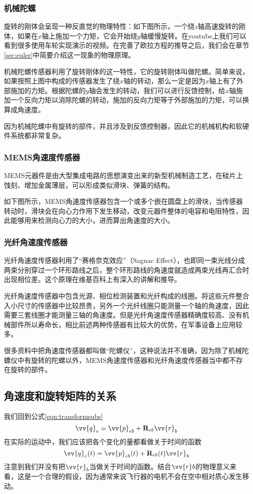 \documentclass[11pt]{article}
\begin{document}
\subsubsection{机械陀螺}
旋转的刚体会呈现一种反直觉的物理特性：如下图所示，一个绕$z$轴高速旋转的刚体，如果在$x$轴上施加一个力矩，它会开始绕$y$轴缓慢旋转。在youtube上我们可以看到很多使用车轮实现演示的视频。在完善了欧拉方程的推导之后，我们会在章节\ref{sec:euler}中简要介绍这一现象的物理原理。

机械陀螺传感器利用了旋转刚体的这一特性，它的旋转刚体叫做陀螺。简单来说，如果按照上图中构成的传感器发生了绕$x$轴的转动，那么一定是因为$x$轴上有了外部施加的力矩。根据陀螺的$y$轴会发生的转动，我们可以进行反馈控制，给$x$轴施加一个反向力矩以消除陀螺的转动，施加的反向力矩等于外部施加的力矩，可以换算成角速度。

因为机械陀螺中有旋转的部件，并且涉及到反馈控制器，因此它的机械机构和软硬件系统都非常复杂。
\subsubsection{MEMS角速度传感器}
MEMS元器件是由大型集成电路的思想演变出来的新型机械制造工艺，在硅片上蚀刻、增加金属薄层，可以形成类似滑块、弹簧的结构。

如下图所示，MEMS角速度传感器包含一个或多个嵌在圆盘上的滑块，当传感器转动时，滑块会在向心力作用下发生移动，改变元器件整体的电容和电阻特性，因此能够用来检测向心力的大小，进而算出角速度的大小。
\subsubsection{光纤角速度传感器}
光纤角速度传感器利用了“赛格奈克效应”（Sagnac Effect），也即同一束光线分成两束分别穿过一个环形路线之后，整个环形路线的角速度就造成两束光线再汇合时出现相位差。这个原理在维基百科上有深入的讲解和推导。

光纤角速度传感器中包含光源、相位检测装置和光纤构成的线圈。将这些元件整合入小尺寸的传感器中比较昂贵，另外一个光纤线圈只能测量一个轴的角速度，因此需要三套线圈才能测量三轴的角速度。但是光纤角速度传感器精确度较高、没有机械部件所以寿命长，相比前述两种传感器有比较大的优势，在军事设备上应用较多。



很多资料中把角速度传感器都叫做“陀螺仪”，这种说法并不准确，因为除了机械陀螺仪中有旋转的陀螺以外，MEMS角速度传感器和光纤角速度传感器当中都不存在旋转的部件。

\subsection{角速度和旋转矩阵的关系}
我们回到公式\ref{eqn:transformsubs}
$$
\vv{q}_{e} = \vv{p}_{eb} + {\bf R}_{eb}\vv{r}_b
$$
在实际的运动中，我们应该把各个变化的量都看做关于时间的函数
\begin{equation}\label{eqn:transformt}
\vv{q}_{e}(t) = \vv{p}_{eb}(t) + {\bf R}_{eb}(t)\vv{r}_b
\end{equation}
注意到我们并没有把$\vv{r}_b$当做关于时间的函数。结合$\vv{r}b$的物理意义来看，这是一个合理的假设，因为通常来说飞行器的电机不会在空中相对质心发生移动。
\end{document}
